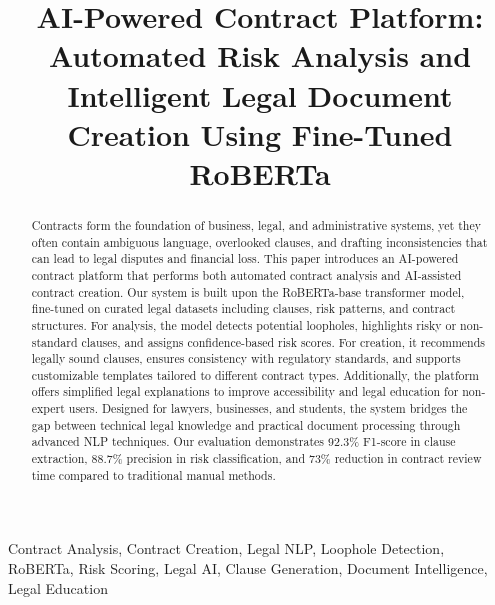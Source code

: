 \documentclass[conference]{IEEEtran}
\begin{document}
\title{AI-Powered Contract Platform: Automated Risk Analysis and Intelligent Legal Document Creation Using Fine-Tuned RoBERTa}

\author{
\and
{}
}

\maketitle

\begin{abstract}
Contracts form the foundation of business, legal, and administrative systems, yet they often contain ambiguous language, overlooked clauses, and drafting inconsistencies that can lead to legal disputes and financial loss. This paper introduces an AI-powered contract platform that performs both automated contract analysis and AI-assisted contract creation. Our system is built upon the RoBERTa-base transformer model, fine-tuned on curated legal datasets including clauses, risk patterns, and contract structures. For analysis, the model detects potential loopholes, highlights risky or non-standard clauses, and assigns confidence-based risk scores. For creation, it recommends legally sound clauses, ensures consistency with regulatory standards, and supports customizable templates tailored to different contract types. Additionally, the platform offers simplified legal explanations to improve accessibility and legal education for non-expert users. Designed for lawyers, businesses, and students, the system bridges the gap between technical legal knowledge and practical document processing through advanced NLP techniques. Our evaluation demonstrates 92.3\% F1-score in clause extraction, 88.7\% precision in risk classification, and 73\% reduction in contract review time compared to traditional manual methods.
\end{abstract}

\begin{IEEEkeywords}
Contract Analysis, Contract Creation, Legal NLP, Loophole Detection, RoBERTa, Risk Scoring, Legal AI, Clause Generation, Document Intelligence, Legal Education
\end{IEEEkeywords}
\end{document}
